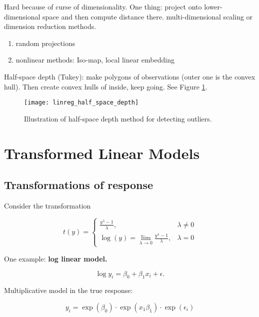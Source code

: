 Hard because of curse of dimensionality. One thing: project onto lower-dimensional space and then compute distance there. multi-dimensional scaling or dimension reduction methods.

\begin{enumerate}

\item random projections



\item nonlinear methods: Iso-map, local linear embedding

\end{enumerate}

Half-space depth (Tukey): make polygons of observations (outer one is the convex hull). Then create convex hulls of inside, keep going. See Figure \ref{linreg.fig.half.space.depth}.

\begin{figure}[htbp]
\begin{center}
\texttt{[image: linreg\_half\_space\_depth]}
\caption{Illustration of half-space depth method for detecting outliers.}
\label{linreg.fig.half.space.depth}
\end{center}
\end{figure}


\section{Transformed Linear Models}

\subsection{Transformations of response}

Consider the transformation

\[
t(y) = \begin{cases}
\frac{y^\lambda - 1}{\lambda} , & \lambda \neq 0 \\
\log(y) = \lim_{\lambda \to 0} \frac{y^\lambda - 1}{\lambda}, & \lambda = 0 
\end{cases}
\]

One example: \textbf{log linear model.}

\[
\log y_i = \beta_0 + \beta_1 x_i + \epsilon.
\]

Multiplicative model in the true response:

\[
y_i = \exp(\beta_0) \cdot \exp(x_1 \beta_1)  \cdot \exp(\epsilon_i)
\]

